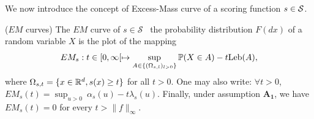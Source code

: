 We now introduce the concept of Excess-Mass curve of a scoring function $s\in \S$.
\begin{definition} {\sc ($EM$ curves)}
The  $EM$ curve of $s\in\mathcal{S}$  \wrt~the probability
distribution $F(dx)$ of a random variable $X$ is the plot of the mapping
\begin{equation}
\label{aistat:EM}
EM_s : t \in [0, \infty[ \mapsto \sup_{A \in \{(\Omega_{s,l})_{l>0}\}} {\mathbb{P}}(X \in A) - t \leb(A),
\end{equation}
where $\Omega_{s,t}=\{ x \in \rset^d, s(x) \ge t \}$ for all $t>0$.
One may also write: $\forall t>0$, $EM_s(t)= \sup_{u>0}~ \alpha_s(u) -
t \lambda_s(u) $. Finally, under assumption $\mathbf{A_1}$, we have $EM_s(t)=0$ for every $t> \|f\|_\infty$. 
\end{definition}


%
%
%
%
%
% 

